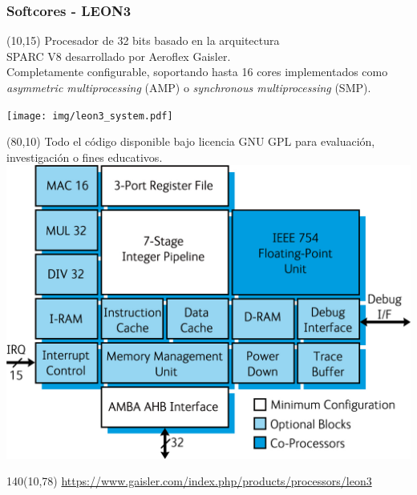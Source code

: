 \documentclass[aspectratio=169]{beamer}
\begin{document}
\begin{frame}[t,fragile]
    \frametitle{Softcores - LEON3}
    \begin{textblock}{70}(10,15) \footnotesize
    Procesador de 32 bits basado en la arquitectura\\
    SPARC V8 desarrollado por Aeroflex Gaisler.\\
    \bigskip
    Completamente configurable, soportando hasta 16 cores implementados como \emph{asymmetric multiprocessing} (AMP) o \emph{synchronous multiprocessing} (SMP).
    \begin{center}
    \texttt{[image: img/leon3\_system.pdf]}
    \end{center}
    \end{textblock}
    \begin{textblock}{70}(80,10)
    \footnotesize Todo el código disponible bajo licencia GNU GPL para evaluación, investigación o fines educativos.\\
    \vspace{0.2cm}
    \includegraphics[scale=0.65]{imgBmp/BLOCK_LEON3.jpg}\\
    \end{textblock}
    \begin{textblock}{140}(10,78) \footnotesize
    \url{https://www.gaisler.com/index.php/products/processors/leon3}
    \end{textblock}
\end{frame}
    
\end{document}
